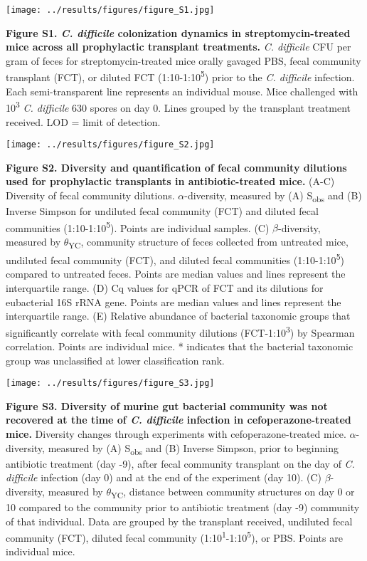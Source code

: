 \documentclass[
  12pt,
]{article}
\begin{document}
\hfill\break

\texttt{[image: ../results/figures/figure\_S1.jpg]}

\textbf{Figure S1. \emph{C. difficile} colonization dynamics in
streptomycin-treated mice across all prophylactic transplant
treatments.} \emph{C. difficile} CFU per gram of feces for
streptomycin-treated mice orally gavaged PBS, fecal community transplant
(FCT), or diluted FCT (1:10-1:10\textsuperscript{5}) prior to the
\emph{C. difficile} infection. Each semi-transparent line represents an
individual mouse. Mice challenged with 10\textsuperscript{3} \emph{C.
difficile} 630 spores on day 0. Lines grouped by the transplant
treatment received. LOD = limit of detection.

\hfill\break

\texttt{[image: ../results/figures/figure\_S2.jpg]}

\textbf{Figure S2. Diversity and quantification of fecal community
dilutions used for prophylactic transplants in antibiotic-treated mice.}
(A-C) Diversity of fecal community dilutions. \(\alpha\)-diversity,
measured by (A) S\textsubscript{obs} and (B) Inverse Simpson for
undiluted fecal community (FCT) and diluted fecal communities
(1:10-1:10\textsuperscript{5}). Points are individual samples. (C)
\(\beta\)-diversity, measured by \(\theta\)\textsubscript{YC}, community
structure of feces collected from untreated mice, undiluted fecal
community (FCT), and diluted fecal communities
(1:10-1:10\textsuperscript{5}) compared to untreated feces. Points are
median values and lines represent the interquartile range. (D) Cq values
for qPCR of FCT and its dilutions for eubacterial 16S rRNA gene. Points
are median values and lines represent the interquartile range. (E)
Relative abundance of bacterial taxonomic groups that significantly
correlate with fecal community dilutions (FCT-1:10\textsuperscript{3})
by Spearman correlation. Points are individual mice. * indicates that
the bacterial taxonomic group was unclassified at lower classification
rank.

\hfill\break

\texttt{[image: ../results/figures/figure\_S3.jpg]}

\textbf{Figure S3. Diversity of murine gut bacterial community was not
recovered at the time of \emph{C. difficile} infection in
cefoperazone-treated mice.} Diversity changes through experiments with
cefoperazone-treated mice. \(\alpha\)-diversity, measured by (A)
S\textsubscript{obs} and (B) Inverse Simpson, prior to beginning
antibiotic treatment (day -9), after fecal community transplant on the
day of \emph{C. difficile} infection (day 0) and at the end of the
experiment (day 10). (C) \(\beta\)-diversity, measured by
\(\theta\)\textsubscript{YC}, distance between community structures on
day 0 or 10 compared to the community prior to antibiotic treatment (day
-9) community of that individual. Data are grouped by the transplant
received, undiluted fecal community (FCT), diluted fecal community
(1:10\textsuperscript{1}-1:10\textsuperscript{5}), or PBS. Points are
individual mice.
\end{document}
